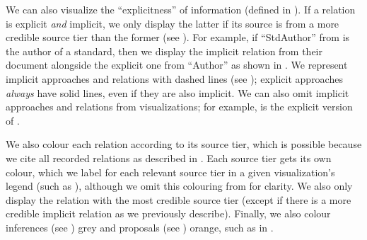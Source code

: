     
    \ExampleSynGraph{}

    \label{visExplicit}
    We can also visualize the ``explicitness'' of information (defined in
    ). If a relation is explicit \emph{and} implicit,
    we only display the latter if its source is from a more credible source
    tier than the former (see ). For example, if
    ``StdAuthor'' from  is the author of a
    standard, then we display the implicit relation from their
    document alongside the explicit one from ``Author'' as shown in
    .
    We represent implicit approaches and relations with dashed lines (see
    ); explicit approaches
    \emph{always} have solid lines, even if they are also implicit. We
    can also omit implicit approaches and relations from visualizations; for
    example,  is the explicit version of
    . %

    We also colour each relation according to its source tier, which is
    possible because we cite all recorded relations as described in
    . Each source tier gets its own colour, which we label
    for each relevant source tier in a given visualization's legend
    (such as ), although we omit this
    colouring from  for
    clarity. We also only display the relation with the most credible source
    tier (except if there is a more credible implicit relation as we previously
    describe). Finally, we also colour inferences (see ) grey and
    proposals (see ) orange, such as in \recFigs{}.

